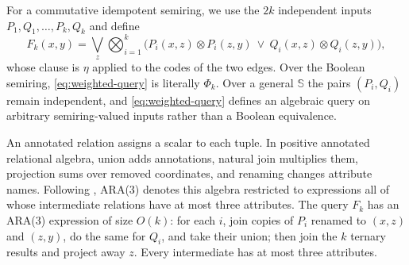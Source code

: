 For a commutative idempotent semiring, we use the $2k$ independent inputs
$P_1,Q_1,\ldots,P_k,Q_k$ and define
\begin{equation}\label{eq:weighted-query}
 F_k(x,y)=\bigvee_z\bigotimes_{i=1}^k
 \bigl(P_i(x,z)\otimes P_i(z,y)\ \vee\
       Q_i(x,z)\otimes Q_i(z,y)\bigr),
\end{equation}
whose clause is $\eta$ applied to the codes of the two edges. Over the
Boolean semiring, \eqref{eq:weighted-query} is literally $\Phi_k$. Over a
general $\mathbb S$ the pairs $(P_i,Q_i)$ remain independent, and
\eqref{eq:weighted-query} defines an algebraic query on arbitrary
semiring-valued inputs rather than a Boolean equivalence.

An annotated relation assigns a scalar to each tuple. In positive annotated
relational algebra, union adds annotations, natural join multiplies them,
projection sums over removed coordinates, and renaming changes attribute
names. Following \citet{brijder2022}, ARA(3) denotes this algebra restricted
to expressions all of whose intermediate relations have at most three
attributes. The query $F_k$ has an ARA(3) expression of size $O(k)$: for
each $i$, join copies of $P_i$ renamed to $(x,z)$ and $(z,y)$, do the same
for $Q_i$, and take their union; then join the $k$ ternary results and
project away $z$. Every intermediate has at most three attributes.

